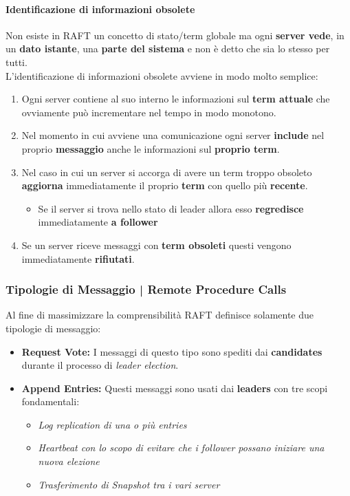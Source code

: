     \paragraph{Identificazione di informazioni obsolete}
    Non esiste in RAFT un concetto di stato/term globale ma ogni \textbf{server vede}, in un \textbf{dato istante}, una \textbf{parte del sistema} e non è detto che sia lo stesso per tutti.\\
    L'identificazione di informazioni obsolete avviene in modo molto semplice:
    \begin{enumerate}
      \item Ogni server contiene al suo interno le informazioni sul \textbf{term attuale} che ovviamente può incrementare nel tempo in modo monotono.
      \item Nel momento in cui avviene una comunicazione ogni server \textbf{include} nel proprio \textbf{messaggio} anche le informazioni sul \textbf{proprio term}.
      \item Nel caso in cui un server si accorga di avere un term troppo obsoleto \textbf{aggiorna} immediatamente il proprio \textbf{term} con quello più \textbf{recente}.
      \begin{itemize}
        \item Se il server si trova nello stato di leader allora esso \textbf{regredisce} immediatamente \textbf{a follower}
      \end{itemize}
      \item Se un server riceve messaggi con \textbf{term obsoleti} questi vengono immediatamente \textbf{rifiutati}.
    \end{enumerate}
  \subsubsection{Tipologie di Messaggio | Remote Procedure Calls}
  Al fine di massimizzare la comprensibilità RAFT definisce solamente due tipologie di messaggio:
  \begin{itemize}
    \item{\textbf{Request Vote:}}
    I messaggi di questo tipo sono spediti dai \textbf{candidates} durante il processo di \textit{leader election}.
    \item{\textbf{Append Entries:}}
    Questi messaggi sono usati dai \textbf{leaders} con tre scopi fondamentali:
    \begin{itemize}
      \item{\emph{Log replication di una o più entries}}
      \item{\emph{Heartbeat con lo scopo di evitare che i follower possano iniziare una nuova elezione}}
      \item{\emph{Trasferimento di Snapshot tra i vari server}}
    \end{itemize}
  \end{itemize}
